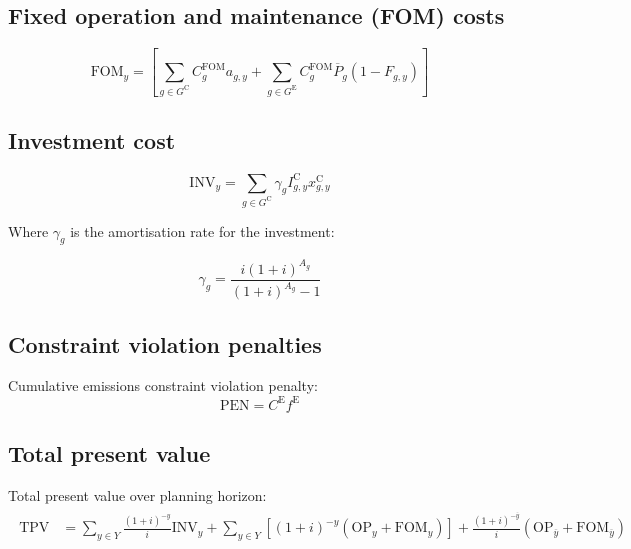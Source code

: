 \documentclass{article}
\newcommand{\sGeneratorsExisting}{G^{\mathrm{E}}}
\newcommand{\sGeneratorsCandidate}{G^{\mathrm{C}}}
\newcommand{\sYears}{Y}
\newcommand{\iGenerator}{g}
\newcommand{\iYear}{y}
\newcommand{\iYearTerminal}{\overline{\iYear}}
\newcommand{\iScenario}{s}
\newcommand{\cOperatingCost}[1][\iYear,\iScenario]{\mathrm{OP}_{#1}}
\newcommand{\cFixedOperationsMaintenanceCost}[1][\iGenerator]{\mathrm{FOM}_{#1}}
\newcommand{\cFixedOperationsMaintenanceCostGenerator}[1][\iGenerator]{C^{\mathrm{FOM}}_{#1}}
\newcommand{\cPowerOutputMax}[1][\iGenerator,\iYear]{\overline{P}_{#1}}
\newcommand{\cAmortisationRate}[1][\iGenerator]{\gamma_{#1}}
\newcommand{\cCandidateInvestmentCost}[1][\iGenerator,\iYear]{I^{\mathrm{C}}_{#1}}
\newcommand{\cInvestmentCost}[1][\iYear]{\mathrm{INV}_{#1}}
\newcommand{\cInterestRate}{i}
\newcommand{\cAssetLifetime}[1][\iGenerator]{A_{#1}}
\newcommand{\cTotalPresentValue}[1][]{\mathrm{TPV}_{#1}}
\newcommand{\cEmissionsTargetViolationPenalty}{C^{\mathrm{E}}}
\newcommand{\cEmissionsViolationTotalCost}{\mathrm{PEN}}
\newcommand{\cRetirementIndicator}[1][\iGenerator,\iYear]{F_{#1}}
\newcommand{\vInstalledCapacity}[1][\iGenerator,\iYear]{x^{\mathrm{C}}_{#1}}
\newcommand{\vEmissionsTargetViolation}{f^{\mathrm{E}}}
\newcommand{\vInstalledCapacityTotal}[1][\iGenerator,\iYear]{a_{#1}}
\begin{document}
\subsection{Fixed operation and maintenance (FOM) costs}

\begin{equation}
	\cFixedOperationsMaintenanceCost[\iYear] = \left[\sum\limits_{\iGenerator \in \sGeneratorsCandidate} \cFixedOperationsMaintenanceCostGenerator \vInstalledCapacityTotal + \sum\limits_{\iGenerator \in \sGeneratorsExisting} \cFixedOperationsMaintenanceCostGenerator \cPowerOutputMax[\iGenerator] \left(1 - \cRetirementIndicator\right) \right]
\end{equation}

\subsection{Investment cost}

\begin{equation}
	\cInvestmentCost = \sum\limits_{g\in \sGeneratorsCandidate} \cAmortisationRate  \cCandidateInvestmentCost \vInstalledCapacity
\end{equation}

Where $\cAmortisationRate$ is the amortisation rate for the investment:

\begin{equation}
	\cAmortisationRate = \frac{\cInterestRate(1+\cInterestRate)^{\cAssetLifetime}}{(1+\cInterestRate)^{\cAssetLifetime} - 1}
\end{equation}

\subsection{Constraint violation penalties}
Cumulative emissions constraint violation penalty:
\begin{equation}
	\cEmissionsViolationTotalCost = \cEmissionsTargetViolationPenalty \vEmissionsTargetViolation
\end{equation}

\subsection{Total present value}

Total present value over planning horizon:
\begin{align}
	\begin{split}
		\cTotalPresentValue & = \sum\limits_{\iYear \in \sYears} \frac{(1+\cInterestRate)^{-\iYear}}{\cInterestRate}\cInvestmentCost + \sum\limits_{\iYear \in \sYears} \left[(1+\cInterestRate)^{-\iYear} (\cOperatingCost[\iYear] + \cFixedOperationsMaintenanceCost[\iYear]) \right] + \frac{(1+\cInterestRate)^{-\iYearTerminal}}{\cInterestRate} \left(\cOperatingCost[\iYearTerminal] + \cFixedOperationsMaintenanceCost[\iYearTerminal] \right)
	\end{split}
\end{align}
\end{document}
